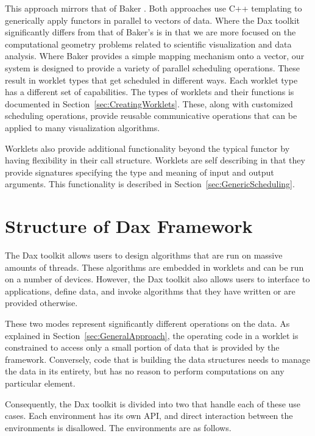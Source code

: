 This approach mirrors that of Baker \etal{}.  Both
approaches use C++ templating to generically apply functors in parallel to
vectors of data.  Where the Dax toolkit significantly differs from that of
Baker's is in that we are more focused on the computational geometry
problems related to scientific visualization and data analysis. Where Baker
provides a simple mapping mechanism onto a vector, our system is designed
to provide a variety of parallel scheduling operations.  These result in
worklet types that get scheduled in different ways.  Each worklet type has
a different set of capabilities. The types of worklets and their functions
is documented in Section~\ref{sec:CreatingWorklets}. These, along with
customized scheduling operations, provide reusable communicative operations
that can be applied to many visualization algorithms.

Worklets also provide additional functionality beyond the typical functor
by having flexibility in their call structure. Worklets are self describing
in that they provide signatures  specifying the type and
meaning of input and output arguments. This functionality is described in
Section~\ref{sec:GenericScheduling}.


\section{Structure of Dax Framework}
\label{sec:StructureOfDaxFramework}

The Dax toolkit allows users to design algorithms that are run on massive
amounts of threads. These algorithms are embedded in worklets
 and can be run on a number of devices. However, the Dax
toolkit also allows users to interface to applications, define data, and
invoke algorithms that they have written or are provided otherwise.

These two modes represent significantly different operations on the
data. As explained in Section~\ref{sec:GeneralApproach}, the operating code
in a worklet is constrained to access only a small portion of data that is
provided by the framework. Conversely, code that is building the data
structures needs to manage the data in its entirety, but has no reason to
perform computations on any particular element.

Consequently, the Dax toolkit is divided into two 
 that handle each of these use cases. Each environment
has its own API, and direct interaction between the environments is
disallowed. The environments are as follows.

